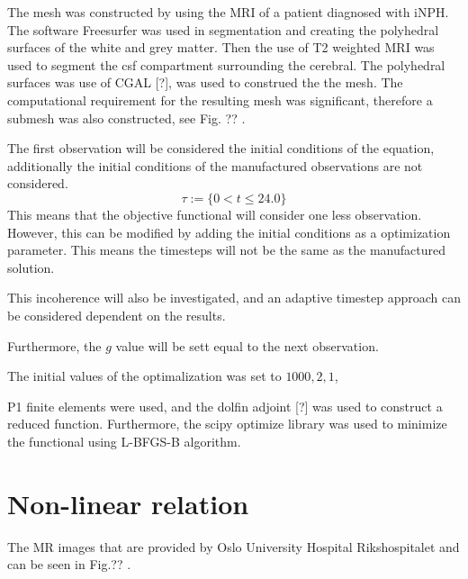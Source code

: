 \documentclass[11pt,a4paper]{article}
\begin{document}
The mesh was constructed by using the MRI of a patient diagnosed with iNPH. The software Freesurfer was used in segmentation and creating the polyhedral surfaces of the white and grey matter. Then the use of T2 weighted MRI was used to segment the csf compartment surrounding the cerebral. The polyhedral surfaces was use of CGAL [?], was used to construed the the mesh. The computational requirement for the resulting mesh was significant, therefore a submesh was also constructed, see Fig. ?? . 






The first observation will be considered the initial conditions of the equation, additionally the initial conditions of the manufactured observations are not considered.  
\begin{equation}
\tau := \lbrace  0 < t  \leq 24.0\rbrace
\end{equation}
This means that the objective functional will consider one less observation. However, this can be modified by adding the initial conditions as a optimization parameter. This means the timesteps will not be the same as the manufactured solution. 

This incoherence will also be investigated, and an adaptive timestep approach can be considered dependent on the results.  





 Furthermore, the $g$ value will be sett equal to the next observation.  






The initial values of the optimalization was set to $1000,2,1$, 













P1 finite elements were used, and the dolfin adjoint [?] was used to construct a reduced function. Furthermore, the scipy optimize library was used to minimize the functional using L-BFGS-B algorithm.   




\section*{Non-linear relation}
The MR images that are provided by Oslo University Hospital Rikshospitalet and can be seen in Fig.?? . 
\end{document}
